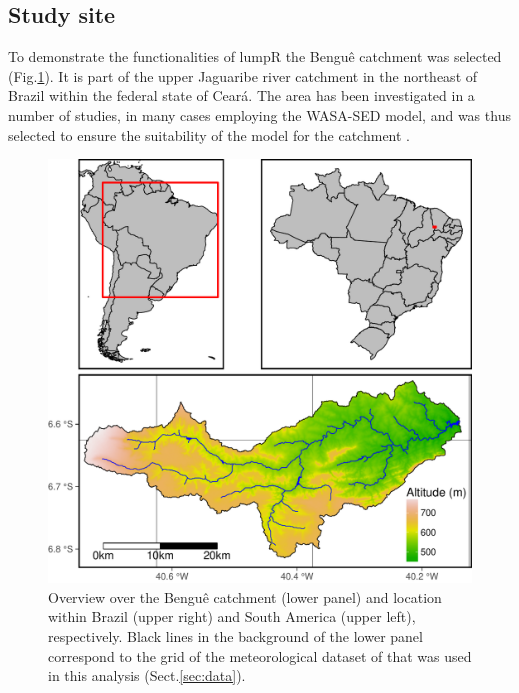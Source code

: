 \subsection{Study site}
\label{sec:study_site}
To demonstrate the functionalities of lumpR the Bengu\^e catchment was selected (Fig.\DIFaddbegin \DIFadd{\ }\DIFaddend \ref{fig:catchment}).
It is part of the upper Jaguaribe river catchment in the northeast of Brazil within the federal state of Cear\'a.
The area has been investigated in a number of studies, in many cases employing the WASA-SED model, and was thus selected to ensure the suitability of the model for the catchment \citep{Medeiros2010,Krol2011,deAraujo2013,Bronstert2014,Medeiros2014a,Medeiros2014b,Figueiredo2016}.

\begin{figure}[t]
\includegraphics[width=\linewidth]{../Script/overview_bengue.pdf}
\caption{Overview over the Bengu\^e catchment (lower panel) and location within Brazil (upper right) and South America (upper left), respectively. Black lines in the background of the lower panel correspond to the grid of the meteorological dataset of \citet{Xavier2016} that was used in this analysis (\DIFdelbeginFL {}\DIFdelendFL \DIFaddbeginFL {}\DIFaddendFL Sect.\DIFaddbeginFL \DIFaddFL{\ }\DIFaddendFL \ref{sec:data}).}
\label{fig:catchment}
\end{figure}

